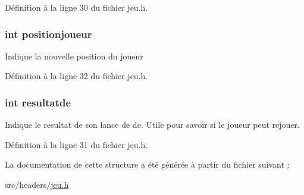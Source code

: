 Définition à la ligne 30 du fichier jeu.\-h.

\hypertarget{structstruct__retourjeu_a886601c5a72273d41b31c90740071a61}{
\subsubsection[{positionjoueur}]{\setlength{\rightskip}{0pt plus 5cm}int positionjoueur}}\label{structstruct__retourjeu_a886601c5a72273d41b31c90740071a61}
Indique la nouvelle position du joueur 

Définition à la ligne 32 du fichier jeu.\-h.

\hypertarget{structstruct__retourjeu_ac584e924232e3ffd27115c09c0fcc55d}{
\subsubsection[{resultatde}]{\setlength{\rightskip}{0pt plus 5cm}int resultatde}}\label{structstruct__retourjeu_ac584e924232e3ffd27115c09c0fcc55d}
Indique le resultat de son lance de de. Utile pour savoir si le joueur peut rejouer. 

Définition à la ligne 31 du fichier jeu.\-h.



La documentation de cette structure a été générée à partir du fichier suivant \-:\begin{DoxyCompactItemize}
\item 
src/headers/\hyperlink{jeu_8h}{jeu.\-h}\end{DoxyCompactItemize}
